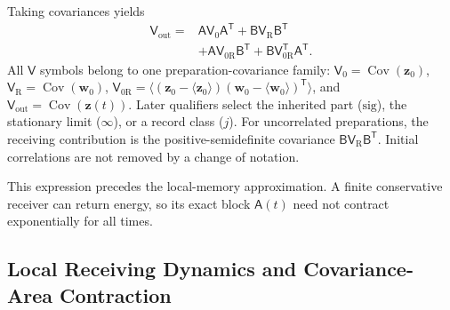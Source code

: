 Taking covariances yields
\begin{equation}
\boxed{\begin{aligned}
 \mathsf V_{\mathrm{out}}={}&
 \mathsf A\mathsf V_0\mathsf A^{\mathsf T}
 +\mathsf B\mathsf V_{\mathrm R}\mathsf B^{\mathsf T}\\
 &+\mathsf A\mathsf V_{0\mathrm R}\mathsf B^{\mathsf T}
 +\mathsf B\mathsf V_{0\mathrm R}^{\mathsf T}\mathsf A^{\mathsf T}.
\end{aligned}}
\label{eq:DMR_full_covariance}
\end{equation}
All $\mathsf V$ symbols belong to one preparation-covariance family: $\mathsf V_0=\operatorname{Cov}(\mathbf z_0)$, $\mathsf V_{\mathrm R}=\operatorname{Cov}(\mathbf w_0)$, $\mathsf V_{0\mathrm R}=\langle(\mathbf z_0-\langle\mathbf z_0\rangle)(\mathbf w_0-\langle\mathbf w_0\rangle)^{\mathsf T}\rangle$, and $\mathsf V_{\mathrm{out}}=\operatorname{Cov}(\mathbf z(t))$. Later qualifiers select the inherited part ($\mathrm{sig}$), the stationary limit ($\infty$), or a record class ($j$). For uncorrelated preparations, the receiving contribution is the positive-semidefinite covariance $\mathsf B\mathsf V_{\mathrm R}\mathsf B^{\mathsf T}$. Initial correlations are not removed by a change of notation.

This expression precedes the local-memory approximation. A finite conservative receiver can return energy, so its exact block $\mathsf A(t)$ need not contract exponentially for all times.

\subsection{Local Receiving Dynamics and Covariance-Area Contraction}
\label{sec:DMR_local_contraction}


